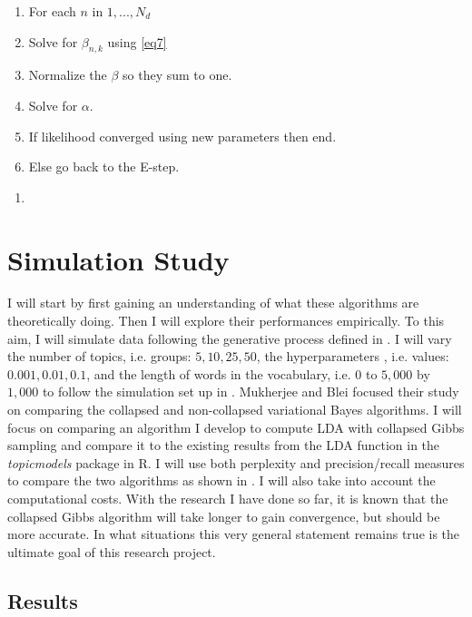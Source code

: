 \documentclass[12pt]{report}
\begin{document}
\begin{flushleft}
\begin{enumerate}
	\item \hspace{10mm} For each $n$ in $1,...,N_{d}$
	\item \hspace{15mm} Solve for $\beta_{n,k}$ using \ref{eq7}
	\item \hspace{15mm} Normalize the $\beta$ so they sum to one.
	\item \hspace{5mm} Solve for $\alpha$.
	\item If likelihood converged using new parameters then end.
	\item Else go back to the E-step.
\end{enumerate}



\begin{enumerate}
	\item 
\end{enumerate}


\section{Simulation Study}
I will start by first gaining an understanding of what these algorithms are theoretically doing. Then I will explore their performances empirically. To this aim, I will simulate data following the generative process defined in \cite{lda}. I will vary the number of topics, i.e. groups: $5,10,25,50$, the hyperparameters , i.e. values: $0.001,0.01,0.1$, and the length of words in the vocabulary, i.e. $0$ to $5,000$ by $1,000$ to follow the simulation set up in \cite{BleiComp}. Mukherjee and Blei focused their study on comparing the collapsed and non-collapsed variational Bayes algorithms. I will focus on comparing an algorithm I develop to compute LDA with collapsed Gibbs sampling and compare it to the existing results from the LDA function in the \textit{topicmodels} package in R. I will use both perplexity and precision/recall measures to compare the two algorithms as shown in \cite{Comp}. I will also take into account the computational costs. With the research I have done so far, it is known that the collapsed Gibbs algorithm will take longer to gain convergence, but should be more accurate. In what situations this very general statement remains true is the ultimate goal of this research project. 
\subsection{Results}


\end{flushleft}
\end{document}

